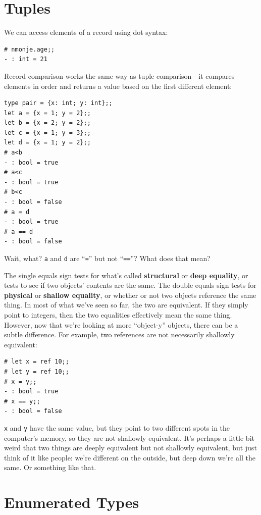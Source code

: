 \documentclass[10pt]{book}
\begin{document}
\section{Tuples}

We can access elements of a record using dot syntax:

\beforeverb
\begin{verbatim}
# nmonje.age;;
- : int = 21
\end{verbatim}
\afterverb

Record comparison works the same way as tuple comparison - it compares 
elements in order and returns a value based on the first different element:

\beforeverb
\begin{verbatim}
type pair = {x: int; y: int};;
let a = {x = 1; y = 2};;
let b = {x = 2; y = 2};;
let c = {x = 1; y = 3};;
let d = {x = 1; y = 2};;
# a<b
- : bool = true
# a<c
- : bool = true
# b<c
- : bool = false
# a = d
- : bool = true
# a == d
- : bool = false
\end{verbatim}
\afterverb

Wait, what? {\tt a} and {\tt d} are ``{\tt =}'' but not ``{\tt ==}''? What does that mean?

The single equals sign tests for what's called {\bf structural} or {\bf deep equality}, or tests to see if two objects' contents are the same. The double equals sign tests for {\bf physical} or {\bf shallow equality}, or whether or not two objects reference the same thing. In most of what we've seen so far, the two are equivalent. If they simply point to integers, then the two equalities effectively mean the same thing. However, now that we're looking at more ``object-y'' objects, there can be a subtle difference. For example, two references are not necessarily shallowly equivalent:

\beforeverb
\begin{verbatim}
# let x = ref 10;;
# let y = ref 10;;
# x = y;;
- : bool = true
# x == y;;
- : bool = false
\end{verbatim}
\afterverb

{\tt x} and {\tt y} have the same value, but they point to two different spots in the computer's memory, so they are not shallowly equivalent. It's perhaps a little bit weird that two things are deeply equivalent but not shallowly equivalent, but just think of it like people: we're different on the outside, but deep down we're all the same. Or something like that.

\section{Enumerated Types}
\end{document}
